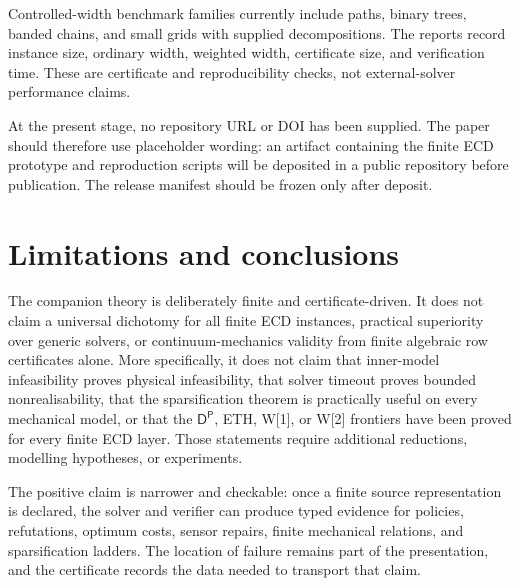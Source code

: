 \documentclass[11pt]{article}
\theoremstyle{plain}
\theoremstyle{definition}
\theoremstyle{remark}
\begin{document}
Controlled-width benchmark families currently include paths, binary trees,
banded chains, and small grids with supplied decompositions.  The reports record
instance size, ordinary width, weighted width, certificate size, and verification
time.  These are certificate and reproducibility checks, not external-solver
performance claims.

At the present stage, no repository URL or DOI has been supplied.  The paper
should therefore use placeholder wording: an artifact containing the finite ECD
prototype and reproduction scripts will be deposited in a public repository
before publication.  The release manifest should be frozen only after deposit.

\section{Limitations and conclusions}
\label{sec:limitations}

The companion theory is deliberately finite and certificate-driven.  It does not
claim a universal dichotomy for all finite ECD instances, practical superiority
over generic solvers, or continuum-mechanics validity from finite algebraic row
certificates alone.  More specifically, it does not claim that inner-model
infeasibility proves physical infeasibility, that solver timeout proves bounded
nonrealisability, that the sparsification theorem is practically useful on every
mechanical model, or that the \(\mathsf D^{\mathsf P}\), ETH, W[1], or W[2]
frontiers have been proved for every finite ECD layer.  Those statements require
additional reductions, modelling hypotheses, or experiments.

The positive claim is narrower and checkable: once a finite source
representation is declared, the solver and verifier can produce typed evidence
for policies, refutations, optimum costs, sensor repairs, finite mechanical
relations, and sparsification ladders.  The location of failure remains part of
the presentation, and the certificate records the data needed to transport that
claim.


\end{document}
